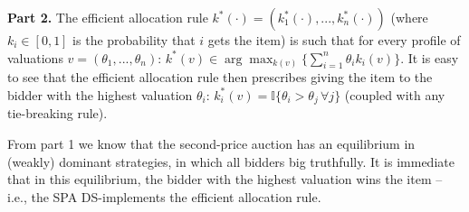\documentclass[a4paper]{article}
\begin{document}
\textbf{Part 2.}
The efficient allocation rule $k^*(\cdot) = (k^*_1(\cdot),...,k^*_n(\cdot))$ (where $k_i \in [0,1]$ is the probability that $i$ gets the item) is such that for every profile of valuations $v=(\theta_1,...,\theta_n)$: $k^*(v) \in \arg \max_{k(v)} \{ \sum_{i=1}^n \theta_i k_i(v) \}$. It is easy to see that the efficient allocation rule then prescribes giving the item to the bidder with the highest valuation $\theta_i$: $k^*_i(v) = \mathbb{I} \{ \theta_i > \theta_j \, \forall j \}$ (coupled with any tie-breaking rule). 

From part 1 we know that the second-price auction has an equilibrium in (weakly) dominant strategies, in which all bidders big truthfully. It is immediate that in this equilibrium, the bidder with the highest valuation wins the item -- i.e., the SPA DS-implements the efficient allocation rule.
\fi 

\end{document}
